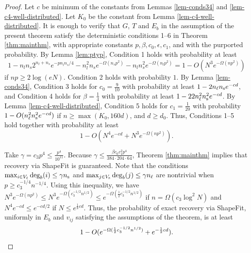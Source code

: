 \begin{proof}
Let $c$ be minimum of the constants from Lemmas \ref{lem-conds34} and \ref{lem-c4-well-distributed}. Let $K_0$ be the constant from Lemma \ref{lem-c4-well-distributed}.
It is enough to verify that $G$, $T$ and $E_b$ in the assumption of the present theorem satisfy the deterministic conditions 1--6 in Theorem \ref{thm:mainthm}, with appropriate constants $p, \beta, c_0, \epsilon, c_1$, and with the purported probability.
By Lemma \ref{lem:ptyp}, Condition 1 holds with probability at least 
$$1 - n_l n_s 2^{n_l + n_s} e^{-pn_ln_s/4} - n_l^2 n_s e^{-\Omega(n_sp^2)} - n_l n_s^2 e^{-\Omega(n_lp^2)} = 1 - O(N^3 e^{-\Omega(np^2)})$$
 if $np \geq 2 \log(eN)$.  Condition 2 holds with probability $1$. By Lemma \ref{lem-conds34}, Condition 3 holds for $c_0 = \frac{9}{10}$ with probability at least $1 - 2 n_\ell n_\text{s} e^{-cd}$, and Condition 4 holds for $\beta = \frac{1}{4}$ with probability at least $1 - 22 n_\ell^2 n_\text{s}^2 e^{-c d}$. 
By Lemma \ref{lem-c4-well-distributed}, Condition 5 holds for $c_1 = \frac{1}{20}$ with probability $1 - O( n_\ell^2 n_\text{s}^2 e^{-cd})$ if $n \geq \max(K_0, 160d) $, and $d \geq d_0$.
 Thus, Conditions 1--5 hold together with probability at least
\[
1 -  O(N^4 e^{-cd} +N^3 e^{-\Omega(n p^2)}).
\]

Take $\gamma = c_3 p^4 \leq \frac{p^4}{10^{11}}$.  Because $\gamma \leq \frac{\beta c_0 c_1^2 p^4}{384\cdot204\cdot64}$, Theorem \ref{thm:mainthm} implies that recovery via ShapeFit is guaranteed.  Note that the conditions $\max_{i\in V_\ell} \deg_b(i) \leq \gamma n_\text{s}$ and $\max_{j \in V_\text{s}} \deg_b(j) \leq \gamma n_\ell$ are nontrivial when $p \geq c_3^{-1/4} n^{-1/4}$.  Using this inequality, we have $N^3 e^{-\Omega(np^2)} \leq N^3 e^{-\Omega(c_3^{-1/2} n^{1/2})} \leq e^{-\Omega(\frac{1}{2} c_3^{-1/2} n^{1/2})}$ if $n = \Omega(c_3 \log^2 N) $ and $N^4 e^{-cd} \le e^{-cd/2}$ if $N \leq e^{\frac{1}{8}c d}$. Thus, the probability of exact recovery via ShapeFit, uniformly in $E_b$ and $v_{ij}$ satisfying the assumptions of the theorem, is at least
\[
1- O(e^{-\Omega(\frac{1}{2}c_3^{-1/2} n^{1/2})} + e^{-\frac{1}{2}c d}). \qedhere
\]



\end{proof}


